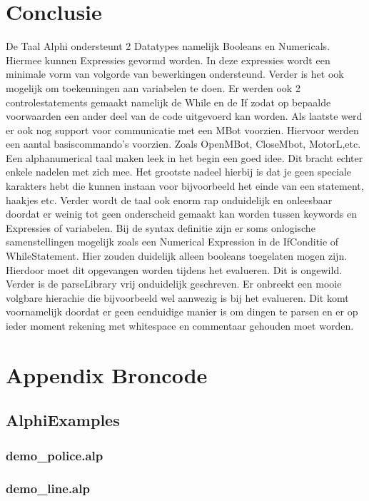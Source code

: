 \documentclass[a4paper,10pt]{article}
\begin{document}
\section{Conclusie}
De Taal Alphi ondersteunt 2 Datatypes namelijk Booleans en Numericals. Hiermee kunnen Expressies gevormd worden.
In deze expressies wordt een minimale vorm van volgorde van bewerkingen ondersteund.
Verder is het ook mogelijk om toekenningen aan variabelen te doen. Er werden ook 2 controlestatements gemaakt namelijk de While en de If zodat op bepaalde voorwaarden een ander deel van de  code uitgevoerd kan worden. Als laatste werd er ook nog support voor communicatie met een MBot voorzien. Hiervoor werden een aantal basiscommando's voorzien. Zoals OpenMBot, CloseMbot, MotorL,etc.
 Een alphanumerical taal maken leek in het begin een goed idee. Dit bracht echter enkele nadelen met zich mee.
Het grootste nadeel hierbij is dat je geen speciale karakters hebt die kunnen instaan voor bijvoorbeeld het einde van een statement, haakjes etc.
Verder wordt de taal ook enorm rap onduidelijk en onleesbaar doordat er weinig tot geen onderscheid gemaakt kan worden tussen keywords en Expressies of variabelen.
Bij de syntax definitie zijn er soms onlogische samenstellingen mogelijk zoals een Numerical Expression in de IfConditie of WhileStatement. Hier zouden duidelijk alleen booleans toegelaten mogen zijn. Hierdoor moet dit opgevangen worden tijdens het evalueren. Dit is ongewild. Verder is 
de parseLibrary vrij onduidelijk geschreven. Er onbreekt een mooie volgbare hierachie die bijvoorbeeld wel aanwezig is bij het evalueren.
Dit komt voornamelijk doordat er geen eenduidige manier is om dingen te parsen en er op ieder moment rekening met whitespace en commentaar gehouden moet worden.
\section{Appendix Broncode}
  \subsection{AlphiExamples}
    \subsubsection{demo\_police.alp}
      
    \subsubsection{demo\_line.alp}
      
\end{document}
